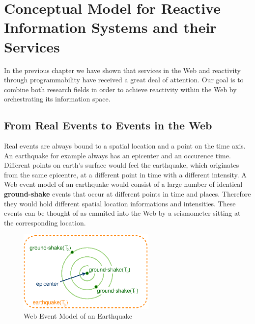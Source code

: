 
\chapter{Conceptual Model for Reactive Information Systems and their Services}

%


In the previous chapter we have shown that services in the Web and reactivity through programmability have received a great deal of attention.
Our goal is to combine both research fields in order to achieve reactivity within the Web by orchestrating its information space. 

\section{From Real Events to Events in the Web}
Real events are always bound to a spatial location and a point on the time axis.
An earthquake for example always has an epicenter and an occurence time.
Different points on earth's surface would feel the earthquake, which originates from the same epicentre, at a different point in time with a different intensity.
A Web event model of an earthquake would consist of a large number of identical \textrm{\textbf{ground-shake}} events that occur at different points in time and places.
Therefore they would hold different spatial location informations and intensities.
These events can be thought of as emmited into the Web by a seismometer sitting at the corresponding location.
\begin{figure}[!ht]
  \centering
  \includegraphics[width=0.6\textwidth]{figures/Earthquake}
  \caption{Web Event Model of an Earthquake}
  \label{fig:Earthquake}
\end{figure}

